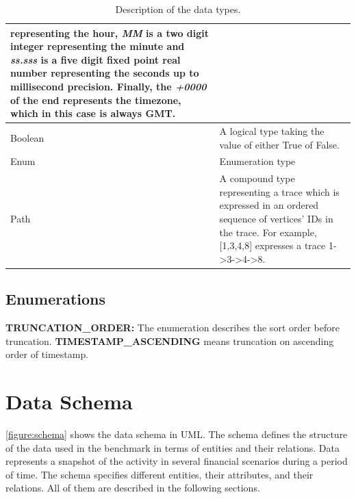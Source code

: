 \begin{table}[h]
\begin{tabular}{|>{\typeCell}p{\attributeColumnWidth}|p{\largeDescriptionColumnWidth}|}
        representing the hour, \textit{MM} is a two digit integer representing
        the minute and \textit{ss.sss} is a five digit fixed point real number
        representing the seconds up to millisecond precision. Finally, the
        \textit{+0000} of the end represents the timezone, which in this case is
        always GMT.                                                              \\
        \hline
        Boolean                 & A logical type taking the value of either True
        of False.                                                                \\
        \hline
        Enum                    & Enumeration type                               \\
        \hline
        Path                    & A compound type representing a trace which is
        expressed in an ordered sequence of vertices' IDs in the trace. For
        example, [1,3,4,8] expresses a trace 1->3->4->8.                         \\
        \hline
    \end{tabular}
    \caption{Description of the data types.}
    \label{table:types}
\end{table}

\subsection{Enumerations}
{\flushleft \textbf{TRUNCATION\_ORDER:}} The enumeration describes the sort
order before truncation. \textbf{TIMESTAMP\_ASCENDING} means truncation on
ascending order of timestamp.


\section{Data Schema}

\autoref{figure:schema} shows the data schema in UML. The schema defines the
structure of the data used in the benchmark in terms of entities and their
relations. Data represents a snapshot of the activity in several financial
scenarios during a period of time. The schema specifies different entities,
their attributes, and their relations. All of them are described in the
following sections.

